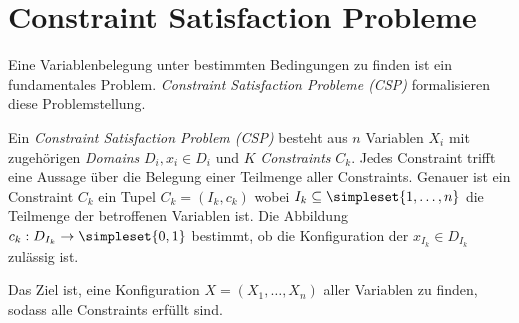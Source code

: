 \section{Constraint Satisfaction Probleme}
Eine Variablenbelegung unter bestimmten Bedingungen zu finden ist ein fundamentales Problem. \emph{Constraint Satisfaction Probleme (CSP)} formalisieren diese Problemstellung.
\begin{definition}
	Ein \emph{Constraint Satisfaction Problem (CSP)} besteht aus $n$ Variablen $X_i$ mit zugehörigen \emph{Domains} $D_i, x_i\in D_i$ und $K$ \emph{Constraints} $C_k$.
	Jedes Constraint trifft eine Aussage über die Belegung einer Teilmenge aller Constraints. Genauer ist ein Constraint $C_k$ ein Tupel $C_k=(I_k,c_k)$ wobei $I_k\subseteq\simpleset{1,\ldots,n}$ die Teilmenge der betroffenen Variablen ist. Die Abbildung $c_k:D_{I_k}\rightarrow \simpleset{0,1}$ bestimmt, ob die Konfiguration der $x_{I_k}\in D_{I_k}$ zulässig ist.

	Das Ziel ist, eine Konfiguration $X=(X_1,\ldots,X_n)$ aller Variablen zu finden, sodass alle Constraints erfüllt sind.
\end{definition}

